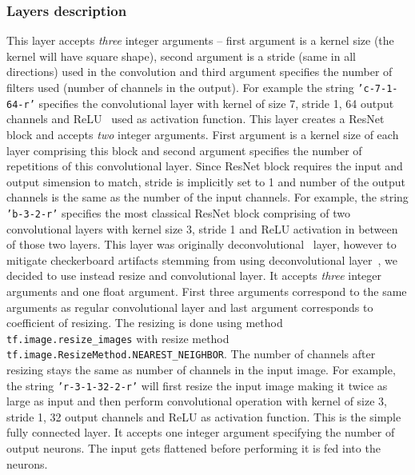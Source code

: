 \subsubsection{Layers description}

\begin{description}
 This layer accepts {\em three} integer arguments -- first argument is a kernel size (the kernel will have square shape), second argument is a stride (same in all directions) used in the convolution and third argument specifies the number of filters used (number of channels in the output). For example the string \texttt{'c-7-1-64-r'} specifies the convolutional layer with kernel of size 7, stride 1, 64 output channels and ReLU~\cite{relu} used as activation function.
 This layer creates a ResNet block and accepts {\em two} integer arguments. First argument is a kernel size of each layer comprising this block and second argument specifies the number of repetitions of this convolutional layer. Since ResNet block requires the input and output simension to match, stride is implicitly set to 1 and number of the output channels is the same as the number of the input channels. For example, the string \texttt{'b-3-2-r'} specifies the most classical ResNet block comprising of two convolutional layers with kernel size 3, stride 1 and ReLU activation in between of those two layers.
 This layer was originally deconvolutional~\cite{deconv} layer, however to mitigate checkerboard artifacts stemming from using deconvolutional layer~\cite{resizeconv}, we decided to use instead resize and convolutional layer. It accepts {\em three} integer arguments and one float argument. First three arguments correspond to the same arguments as regular convolutional layer and last argument corresponds to coefficient of resizing. The resizing is done using method \texttt{tf.image.resize\_images} with resize method \texttt{tf.image.ResizeMethod.NEAREST\_NEIGHBOR}. The number of channels after resizing stays the same as number of channels in the input image. For example, the string \texttt{'r-3-1-32-2-r'} will first resize the input image making it twice as large as input and then perform convolutional operation with kernel of size 3, stride 1, 32 output channels and ReLU as activation function.
 This is the simple fully connected layer. It accepts one integer argument specifying the number of output neurons. The input gets flattened before performing it is fed into the neurons.
\end{description}


